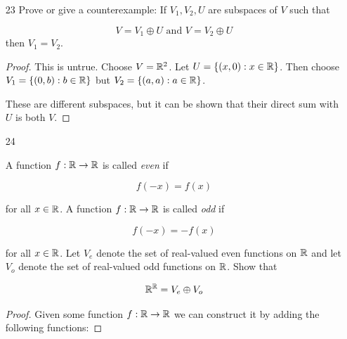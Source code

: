 \begin{enumerate}
    \begin{proof}
        We have 2 variables, so we should have 3 variables in the other one to counteract this. The first 2 terms of $U$ are just $x$ and $y$, which is great because now they cannot vary. We can choose 

        \[W = \{(0, 0, p, q, r) \in \bold F^5: p, q, r \in \bold F\}\]

        And then any vector of the form $(a, b, c, d, e)$ using 

        \begin{align*}
            x &= a \\
            y &= b \\
            p &= c - (x + y) = c - a - b \\
            q &= d - (x - y) = c - a + b \\
            r &= e - (2x) = e - 2a
        \end{align*}
    \end{proof}

    \item[23] Prove or give a counterexample: If $V_1, V_2, U$ are subspaces of $V$ such that 
    
    \[V = V_1 \oplus U \text{  and  } V = V_2 \oplus U \]
    then $V_1 = V_2$.

    \begin{proof}
        This is untrue. Choose $V = \mathbb{R}^2$. Let $U = \{(x, 0): x \in \mathbb{R}\}$. Then choose $V_1 = \{(0, b): b \in \mathbb{R}\}$ but $V_2 = \{(a, a): a \in \mathbb{R}\}$.

        These are different subspaces, but it can be shown that their direct sum with $U$ is both $V$.
    \end{proof}

    \item[24]
    
    A function $f: \mathbb{R} \to \mathbb{R}$ is called \emph{even} if 

    \[f(-x) = f(x)\]

    for all $x \in \mathbb{R}$. A function $f: \mathbb{R} \to \mathbb{R}$ is called \emph{odd} if 

    \[f(-x) = -f(x) \]
    
    for all $x \in \mathbb{R}$. Let $V_e$ denote the set of real-valued even functions on $\mathbb{R}$ and let $V_o$ denote the set of real-valued odd functions on $\mathbb{R}$. Show that 

    \[\mathbb{R}^{\mathbb{R}} = V_e \oplus V_o \]

    \begin{proof}
        Given some function $f: \mathbb{R} \to \mathbb{R}$ we can construct it by adding the following functions: 


\end{proof}
\end{enumerate}
